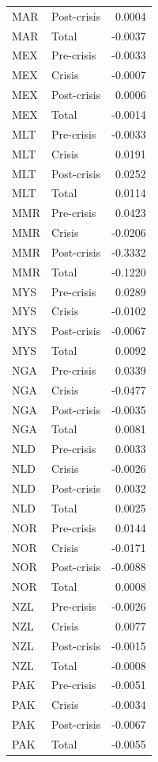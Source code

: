 \begin{longtable}[t]{llr}
MAR & Post-crisis & 0.0004\\
MAR & Total & -0.0037\\
MEX & Pre-crisis & -0.0033\\
MEX & Crisis & -0.0007\\
\addlinespace
MEX & Post-crisis & 0.0006\\
MEX & Total & -0.0014\\
MLT & Pre-crisis & -0.0033\\
MLT & Crisis & 0.0191\\
MLT & Post-crisis & 0.0252\\
\addlinespace
MLT & Total & 0.0114\\
MMR & Pre-crisis & 0.0423\\
MMR & Crisis & -0.0206\\
MMR & Post-crisis & -0.3332\\
MMR & Total & -0.1220\\
\addlinespace
MYS & Pre-crisis & 0.0289\\
MYS & Crisis & -0.0102\\
MYS & Post-crisis & -0.0067\\
MYS & Total & 0.0092\\
NGA & Pre-crisis & 0.0339\\
\addlinespace
NGA & Crisis & -0.0477\\
NGA & Post-crisis & -0.0035\\
NGA & Total & 0.0081\\
NLD & Pre-crisis & 0.0033\\
NLD & Crisis & -0.0026\\
\addlinespace
NLD & Post-crisis & 0.0032\\
NLD & Total & 0.0025\\
NOR & Pre-crisis & 0.0144\\
NOR & Crisis & -0.0171\\
NOR & Post-crisis & -0.0088\\
\addlinespace
NOR & Total & 0.0008\\
NZL & Pre-crisis & -0.0026\\
NZL & Crisis & 0.0077\\
NZL & Post-crisis & -0.0015\\
NZL & Total & -0.0008\\
\addlinespace
PAK & Pre-crisis & -0.0051\\
PAK & Crisis & -0.0034\\
PAK & Post-crisis & -0.0067\\
PAK & Total & -0.0055\\

\end{longtable}
